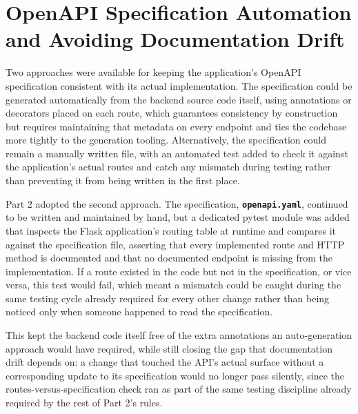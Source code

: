 \section{OpenAPI Specification Automation and Avoiding Documentation Drift}

Two approaches were available for keeping the application's OpenAPI specification consistent with its actual implementation. The specification could be generated automatically from the backend source code itself, using annotations or decorators placed on each route, which guarantees consistency by construction but requires maintaining that metadata on every endpoint and ties the codebase more tightly to the generation tooling. Alternatively, the specification could remain a manually written file, with an automated test added to check it against the application's actual routes and catch any mismatch during testing rather than preventing it from being written in the first place.

Part 2 adopted the second approach. The specification, \textbf{\texttt{openapi.yaml}}, continued to be written and maintained by hand, but a dedicated pytest module was added that inspects the Flask application's routing table at runtime and compares it against the specification file, asserting that every implemented route and HTTP method is documented and that no documented endpoint is missing from the implementation. If a route existed in the code but not in the specification, or vice versa, this test would fail, which meant a mismatch could be caught during the same testing cycle already required for every other change rather than being noticed only when someone happened to read the specification.

This kept the backend code itself free of the extra annotations an auto-generation approach would have required, while still closing the gap that documentation drift depends on: a change that touched the API's actual surface without a corresponding update to its specification would no longer pass silently, since the routes-versus-specification check ran as part of the same testing discipline already required by the rest of Part 2's rules.

